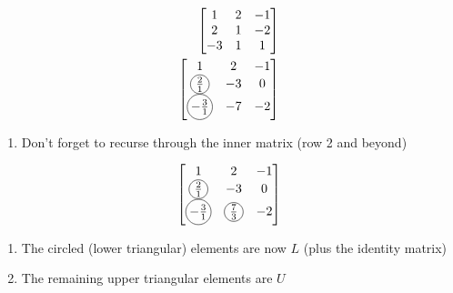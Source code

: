 \documentclass[10pt]{article}
\newcommand*\circled[1]{\tikz[baseline=(char.base)]{
    \node[shape=circle,draw,inner sep=0.5pt] (char) {#1};}}
\begin{document}
\begin{multicols}{2}
\begin{minipage}{\columnwidth}
        \begin{minipage}{0.5\linewidth}
            \begin{align}
                \begin{bmatrix}
                    1  & 2 & -1 \\
                    2  & 1 & -2 \\
                    -3 & 1 & 1
                \end{bmatrix} \\
                \begin{bmatrix}
                    1                          & 2  & -1 \\
                    \circled{\(\frac{2}{1}\)}  & -3 & 0  \\
                    \circled{\(-\frac{3}{1}\)} & -7 & -2
                \end{bmatrix}
            \end{align}
        \end{minipage}
        \begin{enumerate}[resume]
            \item Don't forget to recurse through the inner matrix (row 2 and beyond)
        \end{enumerate}
        \begin{minipage}{0.5\linewidth}
            \begin{align}
                \begin{bmatrix}
                    1                          & 2                         & -1 \\
                    \circled{\(\frac{2}{1}\)}  & -3                        & 0  \\
                    \circled{\(-\frac{3}{1}\)} & \circled{\(\frac{7}{3}\)} & -2
                \end{bmatrix}
            \end{align}
        \end{minipage}
        \begin{enumerate}[resume]
            \item The circled (lower triangular) elements are now \(L\) (plus the identity matrix)
            \item The remaining upper triangular elements are \(U\)
        \end{enumerate}

\end{minipage}
\end{multicols}
\end{document}
